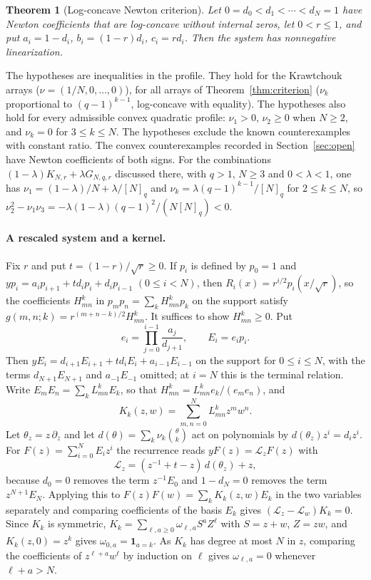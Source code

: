 \documentclass[twoside,10pt]{article}
\numberwithin{equation}{section}
\theoremstyle{slbody}
\newtheorem{theorem}{Theorem}[section]
\theoremstyle{definition}
\theoremstyle{remark}
\begin{document}
\begin{theorem}[Log-concave Newton criterion]\label{thm:lc}
Let $0=d_0<d_1<\cdots<d_N=1$ have Newton coefficients that are log-concave without internal zeros, let $0<r\leq1$, and put $a_i=1-d_i$, $b_i=(1-r)d_i$, $c_i=rd_i$. Then the system has nonnegative linearization.
\end{theorem}

The hypotheses are inequalities in the profile. They hold for the Krawtchouk arrays ($\nu=(1/N,0,\ldots,0)$), for all arrays of Theorem~\ref{thm:criterion} ($\nu_k$ proportional to $(q-1)^{k-1}$, log-concave with equality). The hypotheses also hold for every admissible convex quadratic profile: $\nu_1>0$, $\nu_2\geq0$ when $N\geq2$, and $\nu_k=0$ for $3\leq k\leq N$. The hypotheses exclude the known counterexamples with constant ratio. The convex counterexamples recorded in Section~\ref{sec:open} have Newton coefficients of both signs. For the combinations $(1-\lambda)K_{N,r}+\lambda G_{N,q,r}$ discussed there, with $q>1$, $N\geq3$ and $0<\lambda<1$, one has $\nu_1=(1-\lambda)/N+\lambda/[N]_q$ and $\nu_k=\lambda(q-1)^{k-1}/[N]_q$ for $2\leq k\leq N$, so $\nu_2^2-\nu_1\nu_3=-\lambda(1-\lambda)(q-1)^2/(N[N]_q)<0$.

\paragraph{A rescaled system and a kernel.}
Fix $r$ and put $t=(1-r)/\sqrt r\geq0$. If $p_i$ is defined by $p_0=1$ and $yp_i=a_ip_{i+1}+td_ip_i+d_ip_{i-1}$ $(0\leq i<N)$, then $R_i(x)=r^{i/2}p_i(x/\sqrt r)$, so the coefficients $H_{mn}^k$ in $p_mp_n=\sum_kH_{mn}^kp_k$ on the support satisfy $g(m,n;k)=r^{(m+n-k)/2}H_{mn}^k$. It suffices to show $H_{mn}^k\geq0$. Put
\[
e_i=\prod_{j=0}^{i-1}\frac{a_j}{d_{j+1}},\qquad E_i=e_ip_i.
\]
Then $yE_i=d_{i+1}E_{i+1}+td_iE_i+a_{i-1}E_{i-1}$ on the support for $0\leq i\leq N$, with the terms $d_{N+1}E_{N+1}$ and $a_{-1}E_{-1}$ omitted; at $i=N$ this is the terminal relation. Write $E_mE_n=\sum_kL_{mn}^kE_k$, so that $H_{mn}^k=L_{mn}^ke_k/(e_me_n)$, and
\[
K_k(z,w)=\sum_{m,n=0}^NL_{mn}^kz^mw^n.
\]
Let $\theta_z=z\,\partial_z$ and let $d(\theta)=\sum_k\nu_k\binom\theta k$ act on polynomials by $d(\theta_z)z^i=d_iz^i$. For $F(z)=\sum_{i=0}^NE_iz^i$ the recurrence reads $yF(z)=\mathcal L_zF(z)$ with
\[
\mathcal L_z=(z^{-1}+t-z)\,d(\theta_z)+z,
\]
because $d_0=0$ removes the term $z^{-1}E_0$ and $1-d_N=0$ removes the term $z^{N+1}E_N$. Applying this to $F(z)F(w)=\sum_kK_k(z,w)E_k$ in the two variables separately and comparing coefficients of the basis $E_k$ gives $(\mathcal L_z-\mathcal L_w)K_k=0$. Since $K_k$ is symmetric, $K_k=\sum_{\ell,a\geq0}\omega_{\ell,a}S^aZ^\ell$ with $S=z+w$, $Z=zw$, and $K_k(z,0)=z^k$ gives $\omega_{0,a}=\mathbf1_{a=k}$. As $K_k$ has degree at most $N$ in $z$, comparing the coefficients of $z^{\ell+a}w^\ell$ by induction on $\ell$ gives $\omega_{\ell,a}=0$ whenever $\ell+a>N$.
\end{document}
